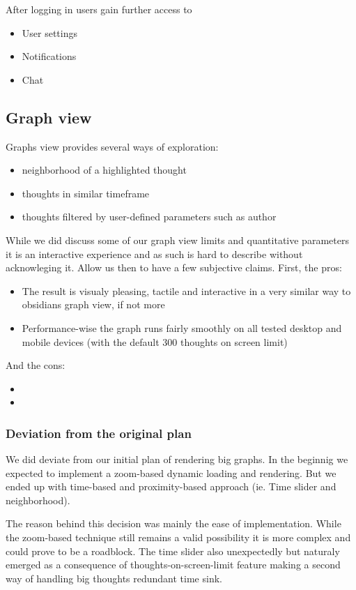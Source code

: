 After logging in users gain further access to
\begin{itemize}
    \item User settings
    \item Notifications
    \item Chat
\end{itemize}

\subsection{Graph view}
Graphs view provides several ways of exploration:
\begin{itemize}
    \item neighborhood of a highlighted thought
    \item thoughts in similar timeframe
    \item thoughts filtered by user-defined parameters such as author 
\end{itemize}

While we did discuss some of our graph view limits and quantitative parameters it is an interactive experience and as such is hard to describe without acknowleging it.
Allow us then to have a few subjective claims.
First, the pros:
\begin{itemize}
    \item The result is visualy pleasing, tactile and interactive in a very similar way to obsidians graph view, if not more
    \item Performance-wise the graph runs fairly smoothly on all tested desktop and mobile devices (with the default 300 thoughts on screen limit)
\end{itemize}
And the cons:
\begin{itemize}
    \item 
    \item 
\end{itemize}



\subsubsection*{Deviation from the original plan}
We did deviate from our initial plan of rendering big graphs.
In the beginnig we expected to implement a zoom-based dynamic loading and rendering.
But we ended up with time-based and proximity-based approach (ie. Time slider and neighborhood).

The reason behind this decision was mainly the ease of implementation.
While the zoom-based technique still remains a valid possibility it is more complex and could prove to be a roadblock.
The time slider also unexpectedly but naturaly emerged as a consequence of thoughts-on-screen-limit feature making a second way of handling big thoughts redundant time sink.
